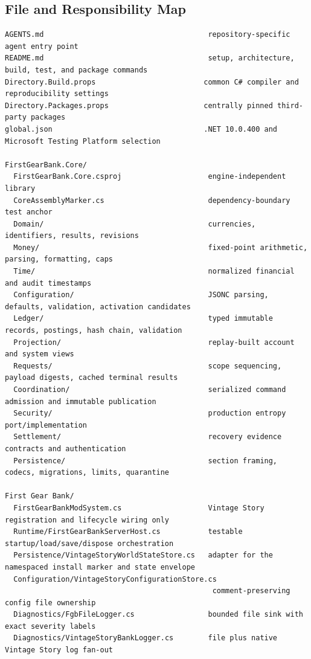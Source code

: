 \documentclass[
  10pt,
  letterpaper,
]{article}
\begin{document}
\subsection{File and Responsibility
Map}\label{file-and-responsibility-map}

\begin{lstlisting}
AGENTS.md                                      repository-specific agent entry point
README.md                                      setup, architecture, build, test, and package commands
Directory.Build.props                         common C# compiler and reproducibility settings
Directory.Packages.props                      centrally pinned third-party packages
global.json                                   .NET 10.0.400 and Microsoft Testing Platform selection

FirstGearBank.Core/
  FirstGearBank.Core.csproj                    engine-independent library
  CoreAssemblyMarker.cs                        dependency-boundary test anchor
  Domain/                                      currencies, identifiers, results, revisions
  Money/                                       fixed-point arithmetic, parsing, formatting, caps
  Time/                                        normalized financial and audit timestamps
  Configuration/                               JSONC parsing, defaults, validation, activation candidates
  Ledger/                                      typed immutable records, postings, hash chain, validation
  Projection/                                  replay-built account and system views
  Requests/                                    scope sequencing, payload digests, cached terminal results
  Coordination/                                serialized command admission and immutable publication
  Security/                                    production entropy port/implementation
  Settlement/                                  recovery evidence contracts and authentication
  Persistence/                                 section framing, codecs, migrations, limits, quarantine

First Gear Bank/
  FirstGearBankModSystem.cs                    Vintage Story registration and lifecycle wiring only
  Runtime/FirstGearBankServerHost.cs           testable startup/load/save/dispose orchestration
  Persistence/VintageStoryWorldStateStore.cs   adapter for the namespaced install marker and state envelope
  Configuration/VintageStoryConfigurationStore.cs
                                                comment-preserving config file ownership
  Diagnostics/FgbFileLogger.cs                 bounded file sink with exact severity labels
  Diagnostics/VintageStoryBankLogger.cs        file plus native Vintage Story log fan-out


\end{lstlisting}
\end{document}
